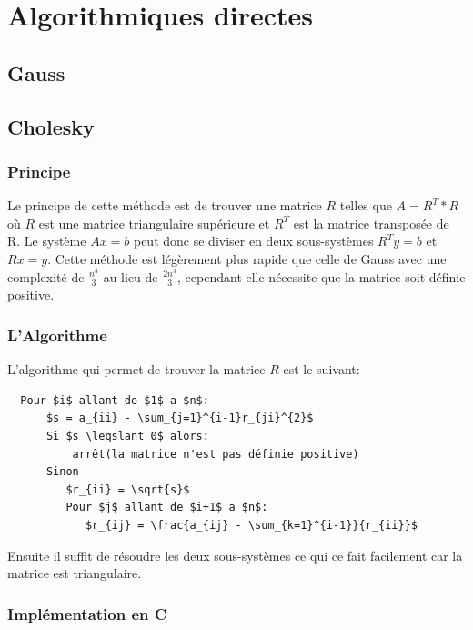 \documentclass[a4paper]{article}
\begin{document}
\tableofcontents

\clearpage

\section*{Algorithmiques directes}

\subsection*{Gauss}

\subsection*{Cholesky}

\subsubsection{Principe}

Le principe de cette méthode est de trouver une matrice $R$ telles que $A =
R^{T} * R$ où $R$ est une matrice triangulaire supérieure et $R^{T}$ est la
matrice transposée de R. Le système $Ax = b$ peut donc se diviser en deux
sous-systèmes $R^{T}y = b$ et $Rx = y$. Cette méthode est légèrement plus rapide
que celle de Gauss avec une complexité de $\frac{n^{3}}{3}$ au lieu de
$\frac{2n^{3}}{3}$, cependant elle nécessite que la matrice soit définie
positive.

\subsubsection{L'Algorithme}

L'algorithme qui permet de trouver la matrice $R$ est le suivant:

\begin{lstlisting}
  Pour $i$ allant de $1$ a $n$:
      $s = a_{ii} - \sum_{j=1}^{i-1}r_{ji}^{2}$
      Si $s \leqslant 0$ alors:
          arrêt(la matrice n'est pas définie positive)
      Sinon
         $r_{ii} = \sqrt{s}$
         Pour $j$ allant de $i+1$ a $n$:
            $r_{ij} = \frac{a_{ij} - \sum_{k=1}^{i-1}}{r_{ii}}$
\end{lstlisting}

Ensuite il suffit de résoudre les deux sous-systèmes ce qui ce fait facilement
car la matrice est triangulaire.

\subsubsection{Implémentation en C}
\end{document}

